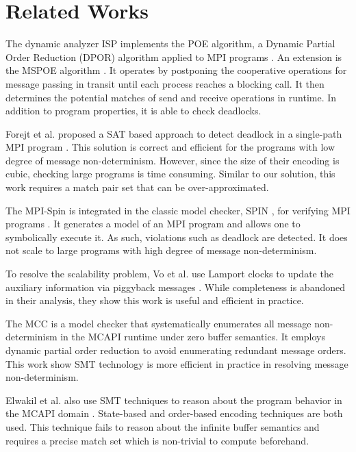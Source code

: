 \section{Related Works}
The dynamic analyzer ISP implements the POE algorithm, a Dynamic Partial Order Reduction (DPOR) algorithm \cite{DBLP:conf/popl/FlanaganG05} applied to MPI programs \cite{DBLP:conf/ppopp/VakkalankaSGK08}. An extension is the MSPOE algorithm \cite{DBLP:conf/sbmf/SharmaGB12}. It operates by postponing the cooperative operations for message passing in transit until each process reaches a blocking call. It then determines the potential matches of send and receive operations in runtime. In addition to program properties, it is able to check deadlocks.

Forejt et al. proposed a SAT based approach to detect deadlock in a single-path MPI program \cite{DBLP:conf/fm/ForejtKNS14}. This solution is correct and efficient for the programs with low degree of message non-determinism. However, since the size of their encoding is cubic, checking large programs is time consuming. Similar to our solution, this work requires a match pair set that can be over-approximated.

The MPI-Spin is integrated in the classic model checker, SPIN \cite{DBLP:journals/tse/Holzmann97}, for verifying MPI programs \cite{DBLP:conf/vmcai/Siegel07,DBLP:conf/pvm/Siegel07}. It generates a model of an MPI program and allows one to symbolically execute it. As such, violations such as deadlock are detected. It does not scale to large programs with high degree of message non-determinism.

To resolve the scalability problem, Vo et al. use Lamport clocks to update the auxiliary information via piggyback messages \cite{DBLP:conf/sc/VoAGSSB10,DBLP:conf/IEEEpact/VoGKSSB11}. While completeness is abandoned in their analysis, they show this work is useful and efficient in practice. 

The MCC is a model checker that systematically enumerates all message non-determinism in the MCAPI runtime under zero buffer semantics. It employs dynamic partial order reduction to avoid enumerating redundant message orders. This work show SMT technology is more efficient in practice in resolving message non-determinism. 

Elwakil et al. also use SMT techniques to reason about the program behavior in the MCAPI domain \cite{DBLP:conf/issta/ElwakilY10,DBLP:conf/atva/ElwakilYW10}. State-based and order-based encoding techniques are both used. This technique fails to reason about the infinite buffer semantics and requires a precise match set which is non-trivial to compute beforehand.

